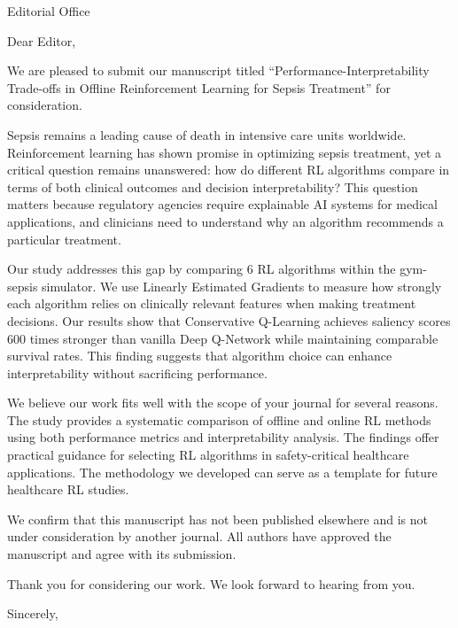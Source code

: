 \documentclass[11pt]{letter}
\begin{document}
\begin{letter}{Editorial Office}

\opening{Dear Editor,}

We are pleased to submit our manuscript titled ``Performance-Interpretability Trade-offs in Offline Reinforcement Learning for Sepsis Treatment'' for consideration.

Sepsis remains a leading cause of death in intensive care units worldwide. Reinforcement learning has shown promise in optimizing sepsis treatment, yet a critical question remains unanswered: how do different RL algorithms compare in terms of both clinical outcomes and decision interpretability? This question matters because regulatory agencies require explainable AI systems for medical applications, and clinicians need to understand why an algorithm recommends a particular treatment.

Our study addresses this gap by comparing 6 RL algorithms within the gym-sepsis simulator. We use Linearly Estimated Gradients to measure how strongly each algorithm relies on clinically relevant features when making treatment decisions. Our results show that Conservative Q-Learning achieves saliency scores 600 times stronger than vanilla Deep Q-Network while maintaining comparable survival rates. This finding suggests that algorithm choice can enhance interpretability without sacrificing performance.

We believe our work fits well with the scope of your journal for several reasons. The study provides a systematic comparison of offline and online RL methods using both performance metrics and interpretability analysis. The findings offer practical guidance for selecting RL algorithms in safety-critical healthcare applications. The methodology we developed can serve as a template for future healthcare RL studies.

We confirm that this manuscript has not been published elsewhere and is not under consideration by another journal. All authors have approved the manuscript and agree with its submission.

Thank you for considering our work. We look forward to hearing from you.

\closing{Sincerely,}

\end{letter}
\end{document}
